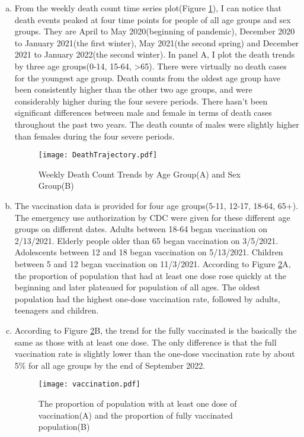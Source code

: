 \documentclass[12pt]{article}
\begin{document}
\begin{enumerate}[(a)]
	\item From the weekly death count time series plot(Figure \ref{weekdeath}), I can notice that death events peaked at four time points for people of all age groups and sex groups. They are April to May 2020(beginning of pandemic), December 2020 to January 2021(the first winter), May 2021(the second spring) and December 2021 to January 2022(the second winter). In panel A, I plot the death trends by three age groups(0-14, 15-64, >65). There were virtually no death cases for the youngest age group. Death counts from the oldest age group have been consistently higher than the other two age groups, and were considerably higher during the four severe periods. There hasn't been significant differences between male and female in terms of death cases throughout the past two years. The death counts of males were slightly higher than females during the four severe periods.
	\begin{figure}[htbp]
		\centering
		\texttt{[image: DeathTrajectory.pdf]}
		\caption{Weekly Death Count Trends by Age Group(A) and Sex Group(B)}\label{weekdeath}
	\end{figure} 
	
	\item The vaccination data is provided for four age groups(5-11, 12-17, 18-64, 65+). The emergency use authorization by CDC were given for these different age groups on different dates. Adults between 18-64 began vaccination on 2/13/2021. Elderly people older than 65 began vaccination on 3/5/2021. Adolescents between 12 and 18 began vaccination on 5/13/2021. Children between 5 and 12 began vaccination on 11/3/2021. According to Figure \ref{vaccinationplot}A, the proportion of population that had at least one dose rose quickly at the beginning and later plateaued for population of all ages. The oldest population had the highest one-dose vaccination rate, followed by adults, teenagers and children.
	
	\item According to Figure \ref{vaccinationplot}B, the trend for the fully vaccinated is the basically the same as those with at least one dose. The only difference is that the full vaccination rate is slightly lower than the one-dose vaccination rate by about 5\% for all age groups by the end of September 2022.
	
	\begin{figure}[htbp]
		\centering
		\texttt{[image: vaccination.pdf]}
		\caption{The proportion of population with at least one dose of vaccination(A) and the proportion of fully vaccinated population(B)}\label{vaccinationplot}
	\end{figure}
\end{enumerate}
\end{document}
